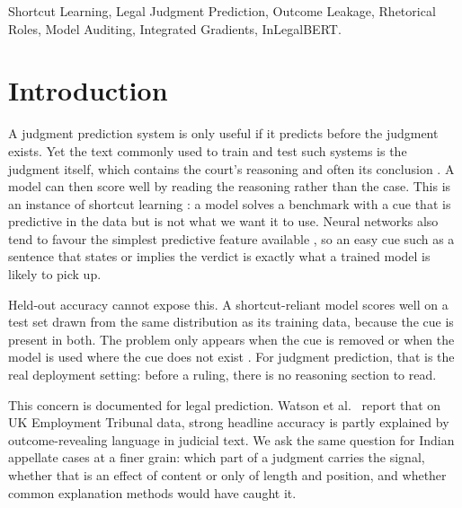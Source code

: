 \documentclass[conference]{IEEEtran}
\begin{document}
\begin{IEEEkeywords}
Shortcut Learning, Legal Judgment Prediction, Outcome Leakage, Rhetorical Roles, Model Auditing, Integrated Gradients, InLegalBERT.
\end{IEEEkeywords}

\section{Introduction}
\label{sec:intro}
A judgment prediction system is only useful if it predicts before the judgment exists. Yet the text commonly used to train and test such systems is the judgment itself, which contains the court's reasoning and often its conclusion \cite{medvedeva2023mcbride}. A model can then score well by reading the reasoning rather than the case. This is an instance of shortcut learning \cite{geirhos2020shortcut}: a model solves a benchmark with a cue that is predictive in the data but is not what we want it to use. Neural networks also tend to favour the simplest predictive feature available \cite{shah2020pitfalls}, so an easy cue such as a sentence that states or implies the verdict is exactly what a trained model is likely to pick up.

Held-out accuracy cannot expose this. A shortcut-reliant model scores well on a test set drawn from the same distribution as its training data, because the cue is present in both. The problem only appears when the cue is removed or when the model is used where the cue does not exist \cite{steinmann2024navigating}. For judgment prediction, that is the real deployment setting: before a ruling, there is no reasoning section to read.

This concern is documented for legal prediction. Watson et al.\ \cite{watson2026shortcut} report that on UK Employment Tribunal data, strong headline accuracy is partly explained by outcome-revealing language in judicial text. We ask the same question for Indian appellate cases at a finer grain: which part of a judgment carries the signal, whether that is an effect of content or only of length and position, and whether common explanation methods would have caught it.
\end{document}
